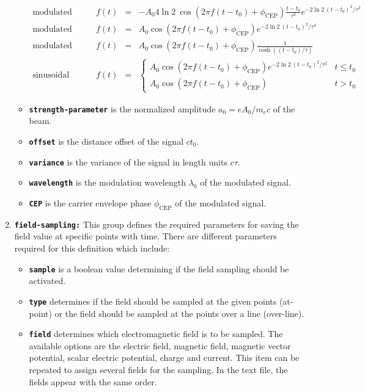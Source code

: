 \begin{enumerate}
\begin{itemize}
\begin{equation}
\begin{array}{lrcl}
	\mbox{modulated Neumann:}  \qquad & f(t) & = & \displaystyle - A_0 4 \ln 2 \: \cos( 2 \pi f (t - t_0) + \phi_\mathrm{CEP} ) \frac{t - t_0}{\tau^2} e^{-2 \ln 2 \: (t - t_0)^2/\tau^2 } \\
	\mbox{modulated Gaussian:} \qquad & f(t) & = & \displaystyle A_0 \cos( 2 \pi f (t - t_0) + \phi_\mathrm{CEP} ) e^{-2 \ln 2 \: (t - t_0)^2/\tau^2 } \\
	\mbox{modulated hyperbolic secant:} \qquad & f(t) & = & \displaystyle A_0 \cos( 2 \pi f (t - t_0) + \phi_\mathrm{CEP} ) \frac{1}{\cosh ( (t - t_0)/\tau ) } \\
	\mbox{sinusoidal pulse:}   \qquad & f(t) & = & \displaystyle \left\{ \begin{array}{ll} A_0 \cos( 2 \pi f (t - t_0) + \phi_\mathrm{CEP} ) e^{-2 \ln 2 \: (t - t_0)^2/\tau^2 } & t \leq t_0 \\ A_0 \cos( 2 \pi f (t - t_0) + \phi_\mathrm{CEP} ) & t > t_0 \end{array} \right.
	\end{array}
	\end{equation}
	\item \textbf{\texttt{strength-parameter}} is the normalized amplitude $a_0 = e A_0 / m_ec $ of the beam.
	\item \textbf{\texttt{offset}} is the distance offset of the signal $ct_0$.
	\item \textbf{\texttt{variance}} is the variance of the signal in length units $c\tau$.
	\item \textbf{\texttt{wavelength}} is the modulation wavelength $\lambda_0$ of the modulated signal.
	\item \textbf{\texttt{CEP}} is the carrier envelope phase $\phi_{\mathrm{CEP}}$ of the modulated signal.
\end{itemize}
\item \textbf{\texttt{field-sampling:}} This group defines the required parameters for saving the field value at specific points with time. There are different parameters required for this definition which include:
\begin{itemize}
	\item \textbf{\texttt{sample}} is a boolean value determining if the field sampling should be activated.
	\item \textbf{\texttt{type}} determines if the field should be sampled at the given points (at-point) or the field should be sampled at the points over a line (over-line).
	\item \textbf{\texttt{field}} determines which electromagnetic field is to be sampled. The available options are the electric field, magnetic field, magnetic vector potential, scalar electric potential, charge and current. This item can be repeated to assign several fields for the sampling. In the text file, the fields appear with the same order.

\end{itemize}
\end{enumerate}
